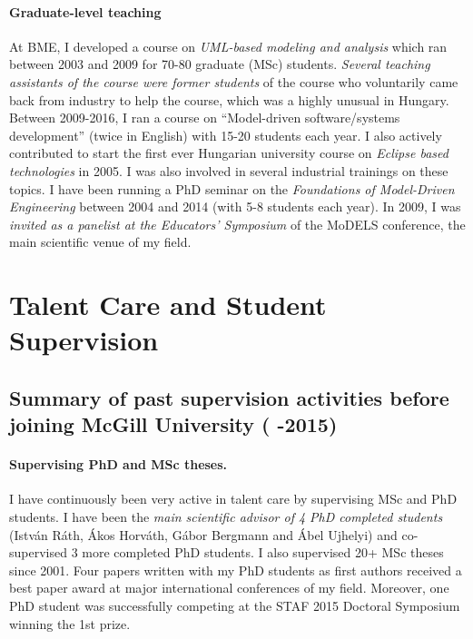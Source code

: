 \paragraph{Graduate-level teaching}
At BME, I developed a course on \emph{UML-based modeling and analysis} which ran between 2003 and 2009 for 70-80 graduate (MSc) students. \emph{Several teaching assistants of the course were former students} of the course who voluntarily came back from industry to help the course, which was a highly unusual in Hungary. Between 2009-2016, I ran a course on “Model-driven software/systems development” (twice in English) with 15-20 students each year. I also actively contributed to start the first ever Hungarian university course on \emph{Eclipse based technologies} in 2005. I was also involved in several industrial trainings on these topics. I have been running a PhD seminar on the \emph{Foundations of Model-Driven Engineering} between 2004 and 2014 (with 5-8 students each year). In 2009, I was \emph{invited as a panelist at the Educators' Symposium} of the MoDELS conference, the main scientific venue of my field. 



\section{Talent Care and Student Supervision}

\subsection{Summary of past supervision activities before joining McGill University ( -2015)}


\paragraph{Supervising PhD and MSc theses.}
I have continuously been very active in talent care by supervising MSc and PhD students. I have been the \emph{main scientific advisor of 4 PhD completed students} (István Ráth, Ákos Horváth, Gábor Bergmann and Ábel Ujhelyi) and co-supervised 3 more completed PhD students. I also supervised 20+ MSc theses since 2001. Four papers written with my PhD students as first authors received a best paper award at major international conferences of my field. Moreover, one PhD student was successfully competing at the STAF 2015 Doctoral Symposium winning the 1st prize. 


